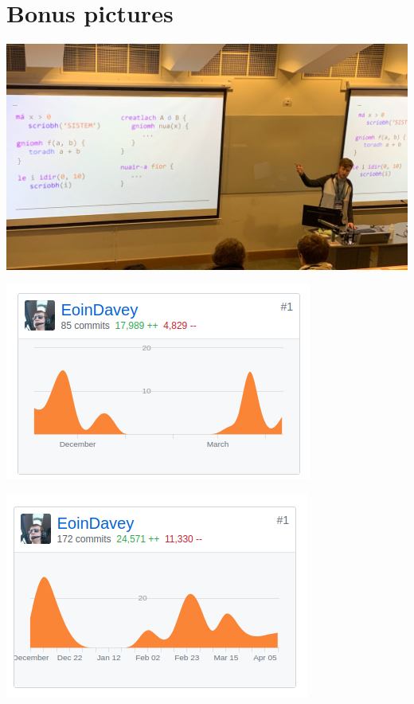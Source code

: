 \section{Bonus pictures}
\begin{center}
    \includegraphics[scale=0.21]{app4assets/talk-pic}
    \label{screenshot:sistem-talk}
\end{center}
\begin{center}
    \includegraphics[scale=0.8]{app4assets/github-tspeg}
    \label{screenshot:github-tspeg}
\end{center}
\begin{center}
    \includegraphics[scale=0.8]{app4assets/github-setanta}
    \label{screenshot:github-setanta}
\end{center}
